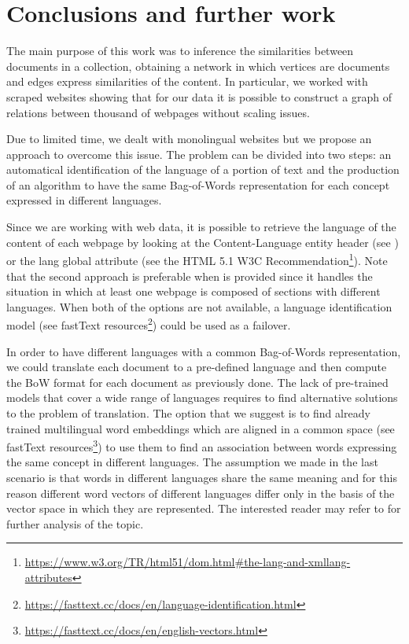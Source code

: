 \chapter{Conclusions and further work}
The main purpose of this work was to inference
the similarities between documents in a collection,
obtaining a network in which vertices are documents and
edges express similarities of the content.
In particular, we worked with scraped websites
showing that for our data it is possible to construct
a graph of relations between thousand of webpages
without scaling issues.

Due to limited time, we dealt with monolingual
websites but we propose an approach to overcome this issue.
The problem can be divided into two steps:
an automatical identification of the language of a portion of text and
the production of an algorithm to have the same Bag-of-Words
representation for each concept expressed in different languages.

Since we are working with web data, it is possible to retrieve the language
of the content of each webpage by looking at the Content-Language entity header
(see \cite{rfc7231}) or the lang global attribute
(see the HTML 5.1 W3C Recommendation\footnote{\url{https://www.w3.org/TR/html51/dom.html\#the-lang-and-xmllang-attributes}}).
Note that the second approach is preferable when  is provided
since it handles the situation in which at least
one webpage is composed of sections with different languages.
When both of the options are not available,
a language identification model
(see fastText resources\footnote{\url{https://fasttext.cc/docs/en/language-identification.html}})
could be used as a failover.

In order to have different languages with a common Bag-of-Words
representation, we could translate each document to a pre-defined language
and then compute the BoW format for each document as previously done.
The lack of pre-trained models that cover a wide range of languages
requires to find alternative solutions to the problem of translation.
The option that we suggest is to find already trained multilingual word embeddings
which are aligned in a common space (see fastText resources\footnote{\url{https://fasttext.cc/docs/en/english-vectors.html}})
to use them to find an association between words expressing the same concept in different languages.
The assumption we made in the last scenario is that words in different languages share
the same meaning and for this reason different word vectors of different languages differ only in the basis
of the vector space in which they are represented.
The interested reader may refer to \cite{DBLP:journals/corr/abs-1804-07745} for further analysis of the topic.